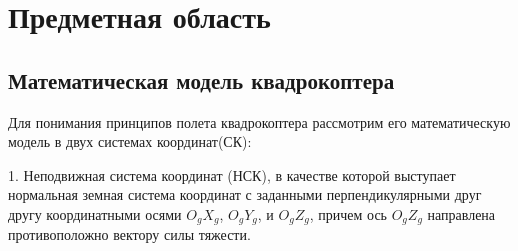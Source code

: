 
\section{Предметная область}

\subsection{Математическая модель квадрокоптера}
Для понимания принципов полета квадрокоптера рассмотрим его математическую модель в двух системах координат(СК):

1. Неподвижная система координат (НСК), в качестве которой выступает нормальная земная система координат с заданными перпендикулярными друг другу координатными осями \(O_{g}X_{g}\), \(O_{g}Y_{g}\), и \(O_{g}Z_{g}\), причем ось \(O_{g}Z_{g}\) направлена противоположно вектору силы тяжести.

